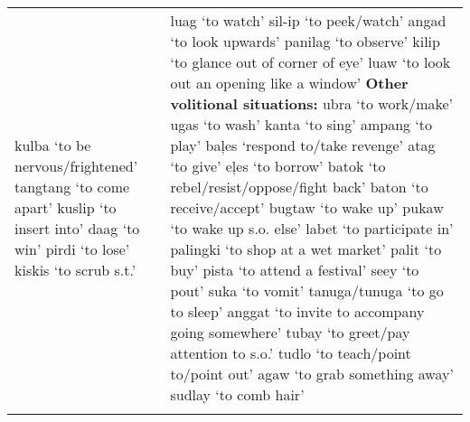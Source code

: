 \begin{table}
\begin{tabular} {
        >{\RaggedRight\arraybackslash}p{5.6cm}
        >{\RaggedRight\arraybackslash}p{5.6cm}
                    }
kulba ‘to be nervous/frightened’\newline
tangtang ‘to come apart’\newline 
kuslip ‘to insert into’\newline 
daag ‘to win’\newline
pirdi ‘to lose’\newline 
kiskis ‘to scrub s.t.’ %
&
luag ‘to watch’\newline 
sil-ip ‘to peek/watch’\newline 
angad ‘to look upwards’\newline 
panilag ‘to observe’\newline 
kilip ‘to glance out of corner of eye’\newline 
luaw ‘to look out an opening like a window’\newline 
{\bfseries Other volitional situations:}\newline
ubra ‘to work/make’\newline 
ugas ‘to wash’\newline 
kanta ‘to sing’\newline 
ampang ‘to play’\newline 
baļes ‘respond to/take revenge’\newline
atag ‘to give’\newline 
eļes ‘to borrow’\newline
batok ‘to rebel/resist/oppose/fight back’\newline 
baton ‘to receive/accept’\newline 
bugtaw ‘to wake up’\newline 
pukaw ‘to wake up s.o. else’\newline 
labet ‘to participate in’\newline 
palingki ‘to shop at a wet market’\newline 
palit ‘to buy’\newline 
pista ‘to attend a festival’\newline 
seey ‘to pout’\newline 
suka ‘to vomit’\newline 
tanuga/tunuga ‘to go to sleep’\newline 
anggat ‘to invite to accompany going somewhere’\newline
tubay ‘to greet/pay attention to s.o.’\newline
tudlo ‘to teach/point to/point out’\newline 
agaw ‘to grab something away’\newline
sudlay ‘to comb hair’\\
\lspbottomrule
\end{tabular}
\end{table}

